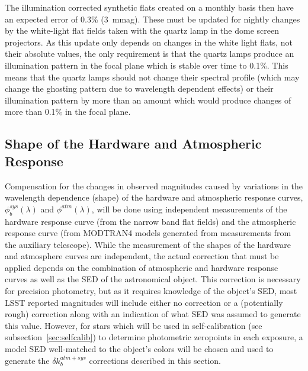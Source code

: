 \documentclass[12pt,preprint]{aastex}
\begin{document}
The illumination corrected synthetic flats created on a monthly basis
then have an expected error of 0.3\% (3~mmag). These must be updated
for nightly changes by the white-light flat fields taken with the
quartz lamp in the dome screen projectors. As this update only depends
on changes in the white light flats, not their absolute values, the
only requirement is that the quartz lamps produce an illumination
pattern in the focal plane which is stable over time to 0.1\%. This
means that the quartz lamps should not change their spectral profile
(which may change the ghosting pattern due to wavelength dependent
effects) or their illumination pattern by more than an amount which
would produce changes of more than 0.1\% in the focal plane.


\subsection{Shape of the Hardware and Atmospheric Response}
\label{sec:phi_correction}

Compensation for the changes in observed magnitudes caused by
variations in the wavelength dependence (shape) of the hardware and
atmospheric response curves, $\phi_b^{sys}(\lambda)$ and
$\phi^{atm}(\lambda)$, will be done using independent measurements of
the hardware response curve (from the narrow band flat fields) and the
atmospheric response curve (from MODTRAN4 models generated from
measurements from the auxiliary telescope).  While the measurement of
the shapes of the hardware and atmosphere curves are independent, the
actual correction that must be applied depends on the combination of
atmospheric and hardware response curves as well as the SED of the
astronomical object.  This correction is necessary for precision
photometry, but as it requires knowledge of the object's SED, most
LSST reported magnitudes will include either no correction or a
(potentially rough) correction along with an indication of what SED
was assumed to generate this value. However, for stars which will be
used in self-calibration (see subsection~\ref{sec:selfcalib}) to
determine photometric zeropoints in each exposure, a model SED
well-matched to the object's colors will be chosen and used to
generate the $\delta k_b^{atm+sys}$ corrections described in this
section.
\end{document}
